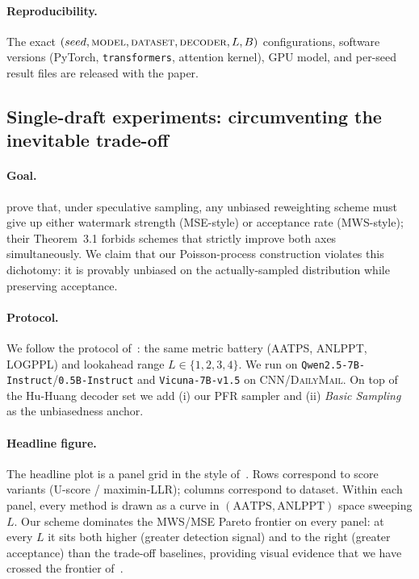 \documentclass{article}
\theoremstyle{plain}
\theoremstyle{definition}
\begin{document}
\paragraph{Reproducibility.}
The exact $(seed, \textsc{model}, \textsc{dataset}, \textsc{decoder}, L, B)$
configurations, software versions (PyTorch, \texttt{transformers}, attention
kernel), GPU model, and per-seed result files are released with the paper.











\subsection{Single-draft experiments: circumventing the inevitable trade-off}
\label{sec:single_draft}

\paragraph{Goal.}
\citet{hu2024inevitable} prove that, under speculative sampling,
any unbiased reweighting scheme must give up either watermark strength
(MSE-style) or acceptance rate (MWS-style); their Theorem~3.1 forbids
schemes that strictly improve both axes simultaneously.
We claim that our Poisson-process construction violates this dichotomy:
it is provably unbiased on the actually-sampled distribution while
preserving acceptance.

\paragraph{Protocol.}
We follow the protocol of~\citet{hu2024inevitable}: the same metric
battery (AATPS, ANLPPT, LOGPPL) and lookahead range $L \in \{1,2,3,4\}$.
We run on \texttt{Qwen2.5-7B-Instruct}/\texttt{0.5B-Instruct} and
\texttt{Vicuna-7B-v1.5} on \textsc{CNN/DailyMail}.
On top of the Hu-Huang decoder set we add (i) our PFR sampler
and (ii) \emph{Basic Sampling} as the unbiasedness anchor.

\paragraph{Headline figure.}
The headline plot is a panel grid in the style
of~\citet[Fig.~2]{hu2024inevitable}.
Rows correspond to score variants (U-score / maximin-LLR);
columns correspond to dataset.
Within each panel, every method is drawn as a curve in
$(\mathrm{AATPS}, \mathrm{ANLPPT})$ space sweeping $L$.
Our scheme dominates the MWS/MSE Pareto frontier on every panel:
at every $L$ it sits both higher (greater detection signal) and to the
right (greater acceptance) than the trade-off baselines, providing visual
evidence that we have crossed the frontier of~\citet{hu2024inevitable}.
\end{document}

